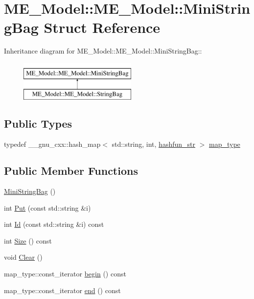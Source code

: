 \hypertarget{structME__Model_1_1MiniStringBag}{
\section{ME\_\-Model::ME\_\-Model::MiniStringBag Struct Reference}
\label{structME__Model_1_1MiniStringBag}
}
Inheritance diagram for ME\_\-Model::ME\_\-Model::MiniStringBag::\begin{figure}[H]
\begin{center}
\leavevmode
\includegraphics[height=2cm]{structME__Model_1_1MiniStringBag}
\end{center}
\end{figure}
\subsection*{Public Types}
\begin{CompactItemize}
\item 
typedef \_\-\_\-gnu\_\-cxx::hash\_\-map$<$ std::string, int, \hyperlink{structME__Model_1_1hashfun__str}{hashfun\_\-str} $>$ \hyperlink{structME__Model_1_1MiniStringBag_a0c098ef108c4d6f43a5034a52347bd1}{map\_\-type}
\end{CompactItemize}
\subsection*{Public Member Functions}
\begin{CompactItemize}
\item 
\hyperlink{structME__Model_1_1MiniStringBag_652ba915492ef9b3144cc38fe014651e}{MiniStringBag} ()
\item 
int \hyperlink{structME__Model_1_1MiniStringBag_32f0102a227ee280ebda9e3555bb1fb1}{Put} (const std::string \&i)
\item 
int \hyperlink{structME__Model_1_1MiniStringBag_65ba142e048cf3786852bd42d7171fc1}{Id} (const std::string \&i) const 
\item 
int \hyperlink{structME__Model_1_1MiniStringBag_1d8f0f0b7cd9749b7173a12fbbccabbc}{Size} () const 
\item 
void \hyperlink{structME__Model_1_1MiniStringBag_8e33bf101509ddad253cd10a781474dd}{Clear} ()
\item 
map\_\-type::const\_\-iterator \hyperlink{structME__Model_1_1MiniStringBag_f5f835816a42486039673465a9673dde}{begin} () const 
\item 
map\_\-type::const\_\-iterator \hyperlink{structME__Model_1_1MiniStringBag_e4a3cd6f62c486989707ab465ef4a6a8}{end} () const 
\end{CompactItemize}
